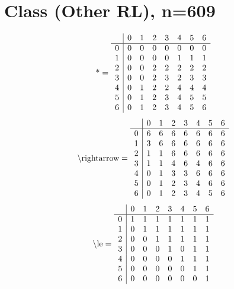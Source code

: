 \documentclass[11pt]{article}
\begin{document}
\section{Class (Other RL), n=609}
\[\text{*} = 
\begin{array}{r | r r r r r r r}
 & 0 & 1 & 2 & 3 & 4 & 5 & 6 \\ \hline
0 & 0 & 0 & 0 & 0 & 0 & 0 & 0 \\
1 & 0 & 0 & 0 & 0 & 1 & 1 & 1 \\
2 & 0 & 0 & 2 & 2 & 2 & 2 & 2 \\
3 & 0 & 0 & 2 & 3 & 2 & 3 & 3 \\
4 & 0 & 1 & 2 & 2 & 4 & 4 & 4 \\
5 & 0 & 1 & 2 & 3 & 4 & 5 & 5 \\
6 & 0 & 1 & 2 & 3 & 4 & 5 & 6 \\
\end{array}
\]
\[\text{\textbackslash rightarrow} = 
\begin{array}{r | r r r r r r r}
 & 0 & 1 & 2 & 3 & 4 & 5 & 6 \\ \hline
0 & 6 & 6 & 6 & 6 & 6 & 6 & 6 \\
1 & 3 & 6 & 6 & 6 & 6 & 6 & 6 \\
2 & 1 & 1 & 6 & 6 & 6 & 6 & 6 \\
3 & 1 & 1 & 4 & 6 & 4 & 6 & 6 \\
4 & 0 & 1 & 3 & 3 & 6 & 6 & 6 \\
5 & 0 & 1 & 2 & 3 & 4 & 6 & 6 \\
6 & 0 & 1 & 2 & 3 & 4 & 5 & 6 \\
\end{array}
\]
\[\text{\textbackslash le} = 
\begin{array}{r | r r r r r r r}
 & 0 & 1 & 2 & 3 & 4 & 5 & 6 \\ \hline
0 & 1 & 1 & 1 & 1 & 1 & 1 & 1 \\
1 & 0 & 1 & 1 & 1 & 1 & 1 & 1 \\
2 & 0 & 0 & 1 & 1 & 1 & 1 & 1 \\
3 & 0 & 0 & 0 & 1 & 0 & 1 & 1 \\
4 & 0 & 0 & 0 & 0 & 1 & 1 & 1 \\
5 & 0 & 0 & 0 & 0 & 0 & 1 & 1 \\
6 & 0 & 0 & 0 & 0 & 0 & 0 & 1 \\
\end{array}
\]
\end{document}
